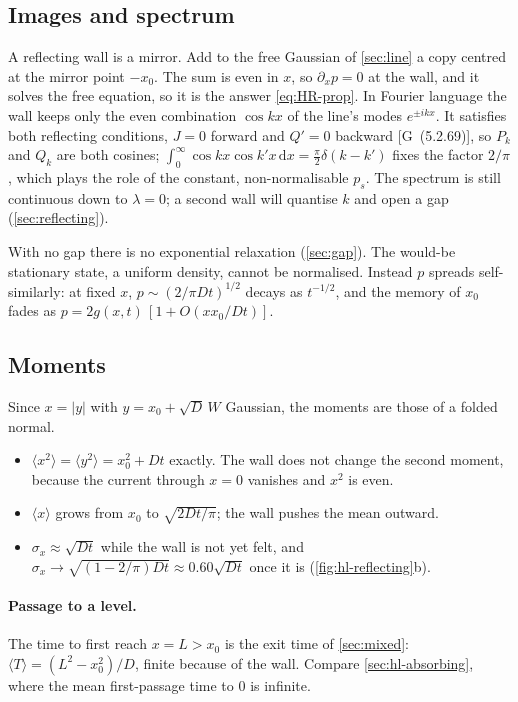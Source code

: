 \documentclass[11pt]{article}
\numberwithin{equation}{section}
\newcommand{\dd}{\mathrm{d}}
\newcommand{\avg}[1]{\langle #1\rangle}
\newcommand{\G}[1]{[G~(#1)]}
\begin{document}
\subsection{Images and spectrum}

A reflecting wall is a mirror. Add to the free Gaussian of \cref{sec:line} a copy centred at the mirror point
$-x_0$. The sum is even in $x$, so $\partial_xp=0$ at the wall, and it solves the free equation, so it is the
answer \cref{eq:HR-prop}. In Fourier language the wall keeps only the even combination $\cos kx$ of the line's
modes $e^{\pm ikx}$. It satisfies both reflecting conditions, $J=0$ forward and $Q'=0$ backward \G{5.2.69}, so
$P_k$ and $Q_k$ are both cosines; $\int_0^\infty\cos kx\cos k'x\,\dd x=\frac\pi2\delta(k-k')$ fixes the factor
$2/\pi$, which plays the role of the constant, non-normalisable $p_s$. The spectrum is still continuous down to
$\lambda=0$; a second wall will quantise $k$ and open a gap (\cref{sec:reflecting}).

With no gap there is no exponential relaxation (\cref{sec:gap}). The would-be stationary state, a uniform density, cannot be
normalised. Instead $p$ spreads self-similarly: at fixed $x$, $p\sim(2/\pi Dt)^{1/2}$ decays as $t^{-1/2}$,
and the memory of $x_0$ fades as $p=2g(x,t)\,[1+O(xx_0/Dt)]$.

\subsection{Moments}

Since $x=\lvert y\rvert$ with $y=x_0+\sqrt D\,W$ Gaussian, the moments are those of a folded normal.
\begin{itemize}
  \item $\avg{x^2}=\avg{y^2}=x_0^2+Dt$ exactly. The wall does not change the second moment, because the
        current through $x=0$ vanishes and $x^2$ is even.
  \item $\avg{x}$ grows from $x_0$ to $\sqrt{2Dt/\pi}$; the wall pushes the mean outward.
  \item $\sigma_x\approx\sqrt{Dt}$ while the wall is not yet felt, and $\sigma_x\to\sqrt{(1-2/\pi)Dt}
        \approx0.60\sqrt{Dt}$ once it is (\cref{fig:hl-reflecting}b).
\end{itemize}

\paragraph{Passage to a level.} The time to first reach $x=L>x_0$ is the exit time of \cref{sec:mixed}:
$\avg{T}=(L^2-x_0^2)/D$, finite because of the wall. Compare \cref{sec:hl-absorbing}, where the mean
first-passage time to $0$ is infinite.
\end{document}
